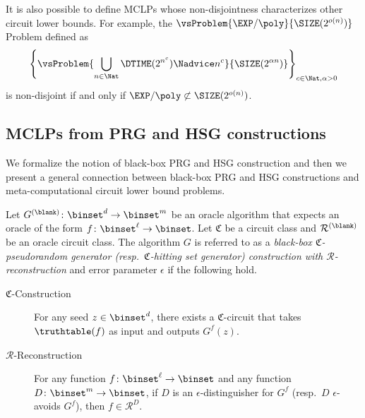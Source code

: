 \documentclass{toc}
\begin{document}
It is also possible to define
MCLPs whose non-disjointness characterizes other circuit lower bounds.
For example,
the $\vsProblem{\EXP/\poly}{\SIZE(2^{o(n)})}$ Problem defined as $$\left\{ \vsProblem{\bigcup_{n \in \Nat}\DTIME(2^{n^c}) \Nadvice n^c}{\SIZE(2^{\alpha n})} \right\}_{c \in \Nat, \alpha > 0}$$
is non-disjoint if and only if $\EXP/\poly \not\subset \SIZE(2^{o(n)})$.



\subsection{MCLPs from PRG and HSG constructions}
\label{subsection_MCLPsFromPRG}

We formalize the notion of black-box PRG and HSG construction
and then we present a general connection
between
black-box PRG and HSG constructions
and
meta-computational circuit lower bound problems.

\begin{definition}
  \label{def_BBConstruction}
  Let $G^{(\blank)} \colon \binset^d \to \binset^m$ be an oracle algorithm
  that expects an oracle of the form $f \colon \binset^\ell \to \binset$.
  Let $\mathfrak{C}$ be a circuit class and $\mathcal{R}^{(\blank)}$ be an oracle circuit class.
  The algorithm $G$ is referred to as
  a \emph{black-box $\mathfrak{C}$-pseudorandom generator
    (resp.\ $\mathfrak{C}$-hitting set generator)
    construction with $\mathcal{R}$-reconstruction} and error parameter $\epsilon$
  if the following hold.
  \begin{description}
    \item[$\mathfrak{C}$-Construction]
          For any seed $z \in \binset^d$,
          there exists a $\mathfrak{C}$-circuit
          that takes $\truthtable(f)$ as input
          and outputs $G^f(z)$.
    \item[$\mathcal{R}$-Reconstruction]
          For any function $f \colon \binset^\ell \to \binset$ and
          any function $D \colon \binset^m \to \binset$,
          if $D$ is an $\epsilon$-distinguisher for $G^f$
          (resp.\ $D$ $\epsilon$-avoids $G^f$),
          then $f \in \mathcal{R}^D$.
  \end{description}
\end{definition}
\end{document}
